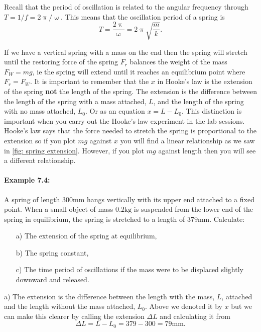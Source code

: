 \documentclass[a4paper,12pt]{book}
\begin{document}
Recall that the period of oscillation is related to the angular frequency through $T=1/f=2\uppi/\upomega$. This means that the oscillation period of a spring is
\begin{equation}
T=\frac{2\uppi}{\upomega}=2\uppi\sqrt{\frac{m}{k}}.
\label{eq: spring period}
\end{equation}

If we have a vertical spring with a mass on the end then the spring will stretch until the restoring force of the spring $F_{r}$ balances the weight of the mass $F_{W}=mg$, ie the spring will extend until it reaches an equilibrium point where $F_{r}=F_{W}$. It is important to remember that the $x$ in Hooke's law is the extension of the spring \textbf{not} the length of the spring. The extension is the difference between the length of the spring with a mass attached, $L$, and the length of the spring with no mass attached, $L_{0}$. Or as an equation $x=L-L_{0}$. This distinction is important when you carry out the Hooke's law experiment in the lab sessions. Hooke's law says that the force needed to stretch the spring is proportional to the extension so if you plot $mg$ against $x$ you will find a linear relationship as we saw in \cref{fig: spring extension}. However, if you plot $mg$ against length then you will see a different relationship.

\paragraph{Example 7.4:} A spring of length $300\text{mm}$ hangs vertically with its upper end attached to a fixed point. When a small object of mass $0.2\text{kg}$ is suspended from the lower end of the spring in equilibrium, the spring is stretched to a length of $379\text{mm}$. Calculate:
\begin{itemize}
\setlength{\itemsep}{-5pt}
    \item[a)] The extension of the spring at equilibrium,
    \item[b)] The spring constant,
    \item[c)] The time period of oscillations if the mass were to be displaced slightly downward and released.
\end{itemize}  

a) The extension is the difference between the length with the mass, $L$, attached and the length without the mass attached, $L_{0}$. Above we denoted it by $x$ but we can make this clearer by calling the extension $\Delta L$ and calculating it from
\begin{equation*}
\Delta L=L-L_{0}=379-300=79\text{mm}.
\end{equation*}
\end{document}
